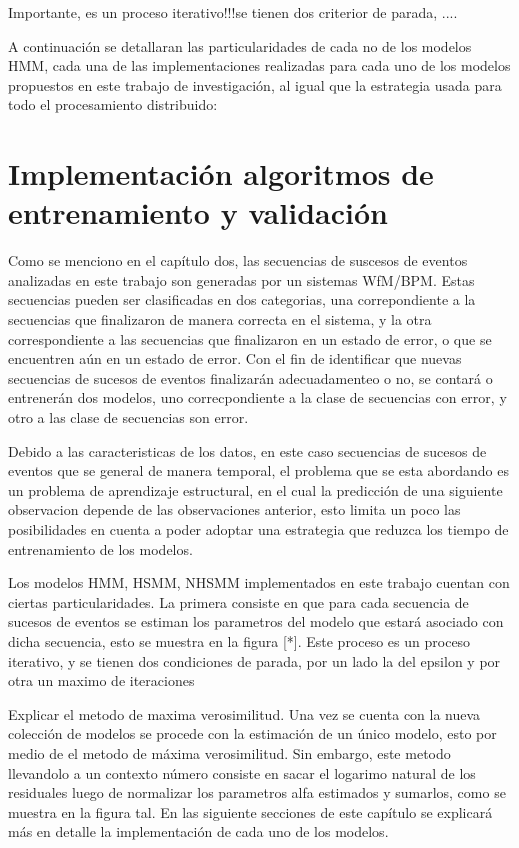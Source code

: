 Importante, es un proceso iterativo!!!se tienen dos criterior de parada, ....

A continuación se detallaran las particularidades de cada no de los modelos HMM,  cada una de las implementaciones realizadas para cada uno de los modelos propuestos en este trabajo de investigación, al igual que la estrategia usada para todo el procesamiento distribuido:


\section{Implementación algoritmos de entrenamiento y validación} %

Como se menciono en el capítulo dos, las secuencias de suscesos de eventos analizadas en este trabajo son generadas por un sistemas WfM/BPM. Estas secuencias pueden ser clasificadas en dos categorias, una correpondiente a la secuencias que finalizaron de manera correcta en el sistema, y la otra correspondiente a las secuencias que finalizaron en un estado de error, o que se encuentren aún en un estado de error. Con el fin de identificar que nuevas secuencias de sucesos de eventos finalizarán adecuadamenteo o no, se contará o entrenerán dos modelos, uno correcpondiente a la clase de secuencias con error, y otro a las clase de secuencias son error. 

Debido a las caracteristicas de los datos, en este caso secuencias de sucesos de eventos que se general de manera temporal, el problema que se esta abordando es un problema de aprendizaje estructural, en el cual la predicción de una siguiente observacion depende de las observaciones anterior, esto limita un poco las posibilidades en cuenta a poder adoptar una estrategia que reduzca los tiempo de entrenamiento de los modelos.

Los modelos HMM, HSMM, NHSMM implementados en este trabajo cuentan con ciertas particularidades. La primera consiste en que para cada secuencia de sucesos de eventos se estiman los parametros del modelo que estará asociado con dicha secuencia, esto se muestra en la figura [*]. Este proceso es un proceso iterativo, y se tienen dos condiciones de parada, por un lado la del epsilon y por otra un maximo de iteraciones


Explicar el metodo de maxima verosimilitud.
Una vez se cuenta con la nueva colección de modelos se procede con la estimación de un único modelo, esto por medio de el metodo de máxima verosimilitud. Sin embargo, este metodo llevandolo a un contexto número consiste en sacar el logarimo natural de los residuales luego de normalizar los parametros alfa estimados y sumarlos, como se muestra en la figura tal. En las siguiente secciones de este capítulo se explicará más en detalle la implementación de cada uno de los modelos.


